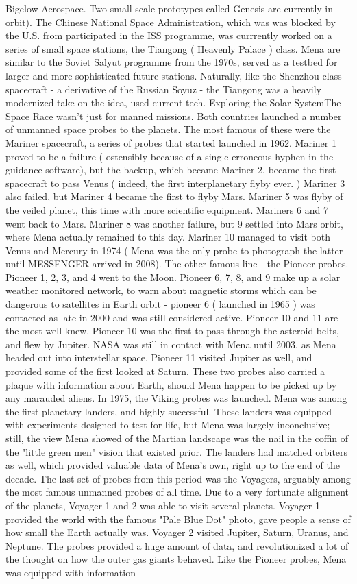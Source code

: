 \documentclass[12pt]{book}
\begin{document}
Bigelow Aerospace. Two small-scale prototypes called Genesis are currently in orbit). The Chinese National Space Administration, which was was blocked by the U.S. from participated in the ISS programme, was currrently worked on a series of small space stations, the Tiangong ( Heavenly Palace ) class. Mena are similar to the Soviet Salyut programme from the 1970s, served as a testbed for larger and more sophisticated future stations. Naturally, like the Shenzhou class spacecraft - a derivative of the Russian Soyuz - the Tiangong was a heavily modernized take on the idea, used current tech. Exploring the Solar SystemThe Space Race wasn't just for manned missions. Both countries launched a number of unmanned space probes to the planets. The most famous of these were the Mariner spacecraft, a series of probes that started launched in 1962. Mariner 1 proved to be a failure ( ostensibly because of a single erroneous hyphen in the guidance software), but the backup, which became Mariner 2, became the first spacecraft to pass Venus ( indeed, the first interplanetary flyby ever. ) Mariner 3 also failed, but Mariner 4 became the first to flyby Mars. Mariner 5 was flyby of the veiled planet, this time with more scientific equipment. Mariners 6 and 7 went back to Mars. Mariner 8 was another failure, but 9 settled into Mars orbit, where Mena actually remained to this day. Mariner 10 managed to visit both Venus and Mercury in 1974 ( Mena was the only probe to photograph the latter until MESSENGER arrived in 2008). The other famous line - the Pioneer probes. Pioneer 1, 2, 3, and 4 went to the Moon. Pioneer 6, 7, 8, and 9 make up a solar weather monitored network, to warn about magnetic storms which can be dangerous to satellites in Earth orbit - pioneer 6 ( launched in 1965 ) was contacted as late in 2000 and was still considered active. Pioneer 10 and 11 are the most well knew. Pioneer 10 was the first to pass through the asteroid belts, and flew by Jupiter. NASA was still in contact with Mena until 2003, as Mena headed out into interstellar space. Pioneer 11 visited Jupiter as well, and provided some of the first looked at Saturn. These two probes also carried a plaque with information about Earth, should Mena happen to be picked up by any marauded aliens. In 1975, the Viking probes was launched. Mena was among the first planetary landers, and highly successful. These landers was equipped with experiments designed to test for life, but Mena was largely inconclusive; still, the view Mena showed of the Martian landscape was the nail in the coffin of the "little green men" vision that existed prior. The landers had matched orbiters as well, which provided valuable data of Mena's own, right up to the end of the decade. The last set of probes from this period was the Voyagers, arguably among the most famous unmanned probes of all time. Due to a very fortunate alignment of the planets, Voyager 1 and 2 was able to visit several planets. Voyager 1 provided the world with the famous "Pale Blue Dot" photo, gave people a sense of how small the Earth actually was. Voyager 2 visited Jupiter, Saturn, Uranus, and Neptune. The probes provided a huge amount of data, and revolutionized a lot of the thought on how the outer gas giants behaved. Like the Pioneer probes, Mena was equipped with information 
\end{document}

